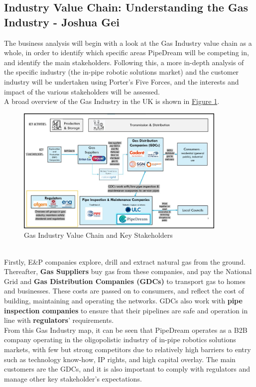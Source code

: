 \documentclass[11pt]{article}		%
\newcommand{\figref}[1]{\hyperref[#1]{Figure \ref*{#1}}}    %
\begin{document}
		\subsection[Industry Value Chain]{Industry Value Chain: Understanding the Gas Industry - Joshua Gei}\label{valueChainSection}
		
		The business analysis will begin with a look at the Gas Industry value chain as a whole, in order to identify which specific areas PipeDream will be competing in, and identify the main stakeholders. Following this, a more in-depth analysis of the specific industry (the in-pipe robotic solutions market) and the customer industry will be undertaken using Porter’s Five Forces, and the interests and impact of the various stakeholders will be assessed. 
        \\
        \hspace*{2ex}A broad overview of the Gas Industry in the UK is shown in \figref{Industry Value Chain}.
		\begin{figure}[h]
				\centering
				\includegraphics[width=0.9\textwidth]{industryvaluechain.jpg}
				\caption{Gas Industry Value Chain and Key Stakeholders}
				\label{Industry Value Chain}
			\end{figure}
		\\
        \hspace*{2ex}Firstly, E\&P companies explore, drill and extract natural gas from the ground. Thereafter, \textbf{Gas Suppliers} buy gas from these companies, and pay the National Grid and \textbf{Gas Distribution Companies (GDCs)} to transport gas to homes and businesses. These costs are passed on to consumers, and reflect the cost of building, maintaining and operating the networks. GDCs also work with \textbf{pipe inspection companies} to ensure that their pipelines are safe and operation in line with \textbf{regulators}’ requirements. 
        \\
        \hspace*{2ex}From this Gas Industry map, it can be seen that PipeDream operates as a B2B company operating in the oligopolistic industry of in-pipe robotics solutions markets, with few but strong competitors due to relatively high barriers to entry such as technology know-how, IP rights, and high capital overlay. The main customers are the GDCs, and it is also important to comply with regulators and manage other key stakeholder's expectations. 
\end{document}
